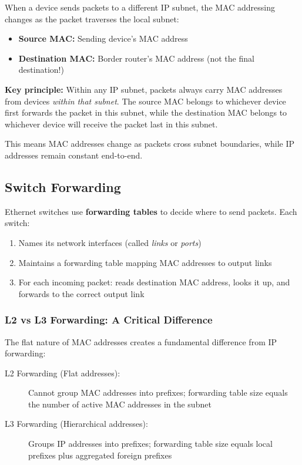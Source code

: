 \documentclass[../../compsys.tex]{subfiles}
\begin{document}
When a device sends packets to a different IP subnet, the MAC addressing changes as the packet traverses the local subnet:

\begin{itemize}
    \item \textbf{Source MAC:} Sending device's MAC address
    \item \textbf{Destination MAC:} Border router's MAC address (not the final destination!)
\end{itemize}

\textbf{Key principle:} Within any IP subnet, packets always carry MAC addresses from devices \emph{within that subnet}. The source MAC belongs to whichever device first forwards the packet in this subnet, while the destination MAC belongs to whichever device will receive the packet last in this subnet.

This means MAC addresses change as packets cross subnet boundaries, while IP addresses remain constant end-to-end.

\subsection{Switch Forwarding}

Ethernet switches use \textbf{forwarding tables} to decide where to send packets. Each switch:

\begin{enumerate}
    \item Names its network interfaces (called \emph{links} or \emph{ports})
    \item Maintains a forwarding table mapping MAC addresses to output links
    \item For each incoming packet: reads destination MAC address, looks it up, and forwards to the correct output link
\end{enumerate}

\subsubsection{L2 vs L3 Forwarding: A Critical Difference}

The flat nature of MAC addresses creates a fundamental difference from IP forwarding:

\begin{description}
    \item[L2 Forwarding (Flat addresses):] Cannot group MAC addresses into prefixes; forwarding table size equals the number of active MAC addresses in the subnet
    \item[L3 Forwarding (Hierarchical addresses):] Groups IP addresses into prefixes; forwarding table size equals local prefixes plus aggregated foreign prefixes
\end{description}
\end{document}
